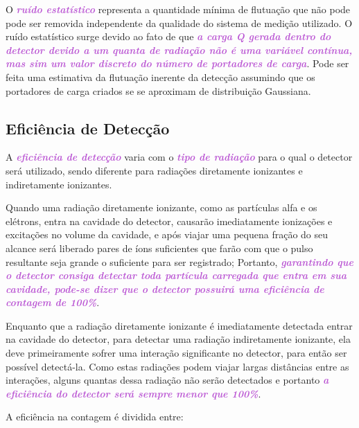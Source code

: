 \documentclass[11pt,a4paper]{article}
\begin{document}
		O \textcolor{MediumOrchid}{\textit{\textbf{ruído estatístico}}} representa a quantidade mínima de flutuação que não pode pode ser removida independente da qualidade do sistema de medição utilizado. O ruído estatístico surge devido ao fato de que \textcolor{MediumOrchid}{\textit{\textbf{a carga Q gerada dentro do detector devido a um quanta de radiação  não é uma variável contínua, mas sim um valor discreto do número de portadores de carga}}}. Pode ser feita uma estimativa da flutuação inerente da detecção assumindo que os portadores de carga criados se se aproximam de distribuição Gaussiana.

	\subsection*{Eficiência de Detecção}

		A \textcolor{MediumOrchid}{\textit{\textbf{eficiência de detecção}}} varia com o \textcolor{MediumOrchid}{\textit{\textbf{tipo de radiação}}} para o qual o detector será utilizado, sendo diferente para radiações diretamente ionizantes e indiretamente ionizantes.

		Quando uma radiação diretamente ionizante, como as partículas alfa e os elétrons, entra na cavidade do detector, causarão imediatamente ionizações e excitações no volume da cavidade, e após viajar uma pequena fração do seu alcance será liberado pares de íons suficientes que farão com que o pulso resultante seja grande o suficiente para ser registrado; Portanto, \textcolor{MediumOrchid}{\textit{\textbf{garantindo que o detector consiga detectar toda partícula carregada que entra em sua cavidade, pode-se dizer que o detector possuirá uma eficiência de contagem de 100\%}}}. 

		Enquanto que a radiação diretamente ionizante é imediatamente detectada entrar na cavidade do detector, para detectar uma radiação indiretamente ionizante, ela deve primeiramente sofrer uma interação significante no detector, para então ser possível detectá-la. Como estas radiações podem viajar largas distâncias entre as interações, alguns quantas dessa radiação não serão detectados e portanto \textcolor{MediumOrchid}{\textit{\textbf{a eficiência do detector será sempre menor que 100\%}}}.

		A eficiência na contagem é dividida entre:
\end{document}
